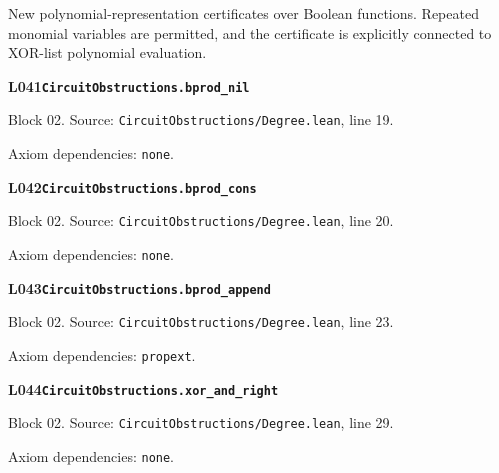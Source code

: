 New polynomial-representation certificates over Boolean functions. Repeated monomial variables are permitted, and the certificate is explicitly connected to XOR-list polynomial evaluation.
\par\medskip
\begin{minipage}{\linewidth}
\hypertarget{L041}{}
{\small\sffamily\bfseries\color{ink}L041\quad\nolinkurl{CircuitObstructions.bprod_nil}}\par
{\scriptsize\sffamily\color{muted}Block 02. Source: \nolinkurl{CircuitObstructions/Degree.lean}, line 19.}\par
{}
{\scriptsize\sffamily\color{muted}Axiom dependencies: \nolinkurl{none}.}
\end{minipage}\par\medskip
\begin{minipage}{\linewidth}
\hypertarget{L042}{}
{\small\sffamily\bfseries\color{ink}L042\quad\nolinkurl{CircuitObstructions.bprod_cons}}\par
{\scriptsize\sffamily\color{muted}Block 02. Source: \nolinkurl{CircuitObstructions/Degree.lean}, line 20.}\par
{}
{\scriptsize\sffamily\color{muted}Axiom dependencies: \nolinkurl{none}.}
\end{minipage}\par\medskip
\begin{minipage}{\linewidth}
\hypertarget{L043}{}
{\small\sffamily\bfseries\color{ink}L043\quad\nolinkurl{CircuitObstructions.bprod_append}}\par
{\scriptsize\sffamily\color{muted}Block 02. Source: \nolinkurl{CircuitObstructions/Degree.lean}, line 23.}\par
{}
{\scriptsize\sffamily\color{muted}Axiom dependencies: \nolinkurl{propext}.}
\end{minipage}\par\medskip
\begin{minipage}{\linewidth}
\hypertarget{L044}{}
{\small\sffamily\bfseries\color{ink}L044\quad\nolinkurl{CircuitObstructions.xor_and_right}}\par
{\scriptsize\sffamily\color{muted}Block 02. Source: \nolinkurl{CircuitObstructions/Degree.lean}, line 29.}\par
{}
{\scriptsize\sffamily\color{muted}Axiom dependencies: \nolinkurl{none}.}
\end{minipage}\par\medskip

